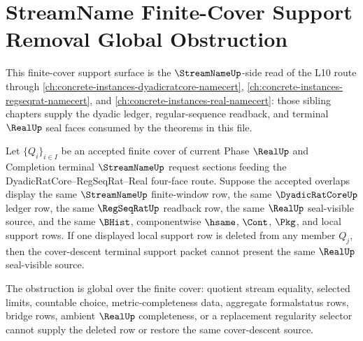 \section{StreamName Finite-Cover Support Removal Global Obstruction}
\label{sec:streamname-finite-cover-support-removal-global-obstruction}

This finite-cover support surface is the $\StreamNameUp$-side read of the
L10 route through
\autoref{ch:concrete-instances-dyadicratcore-namecert},
\autoref{ch:concrete-instances-regseqrat-namecert}, and
\autoref{ch:concrete-instances-real-namecert}: those sibling chapters supply
the dyadic ledger, regular-sequence readback, and terminal $\RealUp$ seal faces
consumed by the theorems in this file.

\begin{theorem}
\label{thm:streamname-finite-cover-support-removal-global-obstruction}
Let $\{Q_i\}_{i \in I}$ be an accepted finite cover of current Phase
$\RealUp$ and Completion terminal $\StreamNameUp$ request sections feeding the
DyadicRatCore--RegSeqRat--Real four-face route. Suppose the accepted overlaps
display the same $\StreamNameUp$ finite-window row, the same
$\DyadicRatCoreUp$ ledger row, the same $\RegSeqRatUp$ readback row, the same
$\RealUp$ seal-visible source, and the same $\BHist$, componentwise $\hsame$,
$\Cont$, $\Pkg$, and local \NameCert{} support rows. If one displayed local
support row is deleted from any member $Q_j$, then the cover-descent terminal
support packet cannot present the same $\RealUp$ seal-visible source.

The obstruction is global over the finite cover: quotient stream equality,
selected limits, countable choice, metric-completeness data, aggregate
formalstatus rows, bridge rows, ambient $\RealUp$ completeness, or a replacement
regularity selector cannot supply the deleted row or restore the same
cover-descent source.
\end{theorem}
